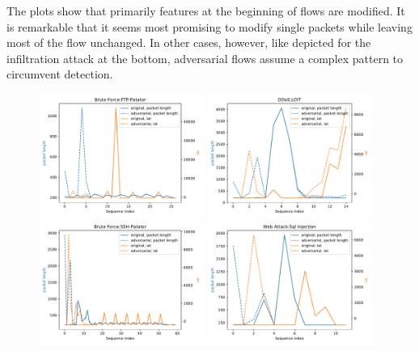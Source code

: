 \documentclass[conference]{IEEEtran}
\begin{document}
The plots show that primarily features at the beginning of flows are modified. It is remarkable that it seems most promising to modify single packets while leaving most of the flow unchanged. In other cases, however, like depicted for the infiltration attack at the bottom, adversarial flows assume a complex pattern to circumvent detection.

\begin{figure}[p]
\includegraphics[width=0.48\textwidth]{../plots/plot_adv/1.pdf}
\includegraphics[width=0.48\textwidth]{../plots/plot_adv/2.pdf}
\includegraphics[width=0.48\textwidth]{../plots/plot_adv/3.pdf}
\includegraphics[width=0.48\textwidth]{../plots/plot_adv/4.pdf}

\end{figure}
\end{document}
